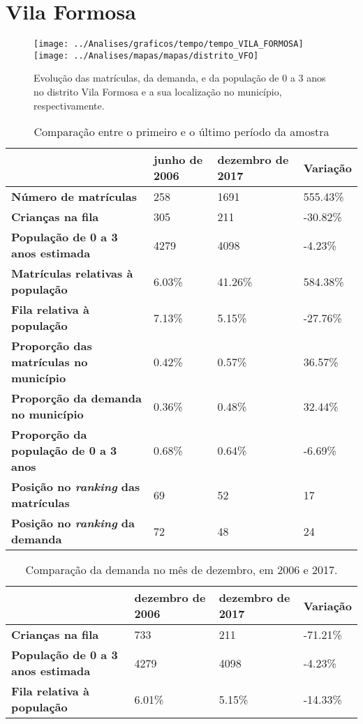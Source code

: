 \section{Vila Formosa}
\begin{figure}[H]
	\centering
	\texttt{[image: ../Analises/graficos/tempo/tempo\_VILA\_FORMOSA]}
	\texttt{[image: ../Analises/mapas/mapas/distrito\_VFO]}
	\caption{Evolução das matrículas, da demanda, e da população de 0 a 3 anos no distrito Vila Formosa e a sua localização no município, respectivamente.}
\end{figure}
\begin{table}[H]
	\begin{tabular}{|l|l|l|l|}
		\hline
		\textbf{}                                      & \textbf{junho de 2006}       & \textbf{dezembro de 2017}    & \textbf{Variação} \\ \hline
		\textbf{Número de matrículas}                  & 258 & 1691 & 555.43\% \\ \hline
		\textbf{Crianças na fila}                      & 305 & 211 & -30.82\% \\ \hline
		\textbf{População de 0 a 3 anos estimada}      & 4279 & 4098 & -4.23\% \\ \hline
		\textbf{Matrículas relativas à população}      & 6.03\% & 41.26\% & 584.38\% \\ \hline
		\textbf{Fila relativa à população}             & 7.13\% & 5.15\% & -27.76\% \\ \hline
		\textbf{Proporção das matrículas no município} & 0.42\% & 0.57\% & 36.57\% \\ \hline
		\textbf{Proporção da demanda no município}     & 0.36\% & 0.48\% & 32.44\% \\ \hline
		\textbf{Proporção da população de 0 a 3 anos}  & 0.68\% & 0.64\% & -6.69\% \\ \hline
		\textbf{Posição no \textit{ranking} das matrículas}     & 69 & 52 & 17 \\ \hline
		\textbf{Posição no \textit{ranking} da demanda}         & 72 & 48 & 24 \\ \hline
	\end{tabular}
	\caption{Comparação entre o primeiro e o último período da amostra}
\end{table}
\begin{table}[H]
	\begin{tabular}{|l|l|l|l|}
		\hline
		\textbf{}                                 & \textbf{dezembro de 2006} & \textbf{dezembro de 2017} & \textbf{Variação} \\ \hline
		\textbf{Crianças na fila}                      & 733 & 211 & -71.21\% \\ \hline
		\textbf{População de 0 a 3 anos estimada}      & 4279 & 4098 & -4.23\% \\ \hline
		\textbf{Fila relativa à população}             & 6.01\% & 5.15\% & -14.33\% \\ \hline
	\end{tabular}
	\caption{Comparação da demanda no mês de dezembro, em 2006 e 2017.}
\end{table}
